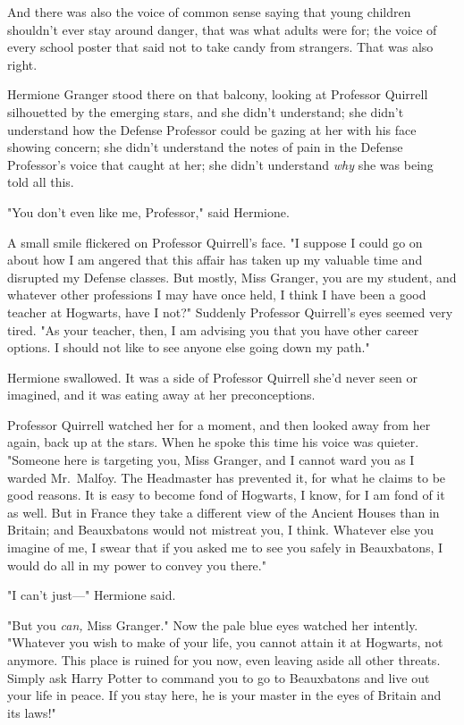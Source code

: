 And there was also the voice of common sense saying that young children
shouldn't ever stay around danger, that was what adults were for; the voice of
every school poster that said not to take candy from strangers. That was also
right.

Hermione Granger stood there on that balcony, looking at Professor Quirrell
silhouetted by the emerging stars, and she didn't understand; she didn't
understand how the Defense Professor could be gazing at her with his face
showing concern; she didn't understand the notes of pain in the Defense
Professor's voice that caught at her; she didn't understand \emph{why} she was
being told all this.

"You don't even like me, Professor," said Hermione.

A small smile flickered on Professor Quirrell's face. "I suppose I could go on
about how I am angered that this affair has taken up my valuable time and
disrupted my Defense classes. But mostly, Miss Granger, you are my student, and
whatever other professions I may have once held, I think I have been a good
teacher at Hogwarts, have I not?" Suddenly Professor Quirrell's eyes seemed
very tired. "As your teacher, then, I am advising you that you have other
career options. I should not like to see anyone else going down my path."

Hermione swallowed. It was a side of Professor Quirrell she'd never seen or
imagined, and it was eating away at her preconceptions.

Professor Quirrell watched her for a moment, and then looked away from her
again, back up at the stars. When he spoke this time his voice was quieter.
"Someone here is targeting you, Miss Granger, and I cannot ward you as I warded
Mr.~Malfoy. The Headmaster has prevented it, for what he claims to be good
reasons. It is easy to become fond of Hogwarts, I know, for I am fond of it as
well. But in France they take a different view of the Ancient Houses than in
Britain; and Beauxbatons would not mistreat you, I think. Whatever else you
imagine of me, I swear that if you asked me to see you safely in Beauxbatons, I
would do all in my power to convey you there."

"I can't just\mbox{---}" Hermione said.

"But you \emph{can,} Miss Granger." Now the pale blue eyes watched her
intently. "Whatever you wish to make of your life, you cannot attain it at
Hogwarts, not anymore. This place is ruined for you now, even leaving aside all
other threats. Simply ask Harry Potter to command you to go to Beauxbatons and
live out your life in peace. If you stay here, he is your master in the eyes of
Britain and its laws!"

